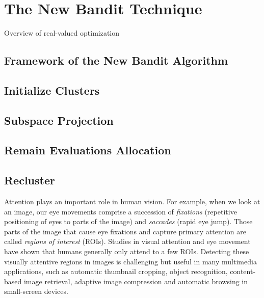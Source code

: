 \chapter{The New Bandit Technique}
\label{c:new_bandit}

Overview of real-valued optimization

\section{Framework of the New Bandit Algorithm}
\section{Initialize Clusters}
\section{Subspace Projection}
\section{Remain Evaluations Allocation}
\section{Recluster}



Attention plays an important role in human vision. For example, when
we look at an image, our eye movements comprise a succession of {\em
fixations} (repetitive positioning of eyes to parts of the image)
and {\em saccades} (rapid eye jump). Those parts of the image that
cause eye fixations and capture primary attention are called {\em
regions of interest} (ROIs). Studies in visual attention and eye
movement have shown that humans generally only attend to a few ROIs.
Detecting these visually attentive regions in images is challenging
but useful in many multimedia applications, such as automatic
thumbnail cropping, object recognition, content-based image
retrieval, adaptive image compression and automatic browsing in
small-screen devices.

